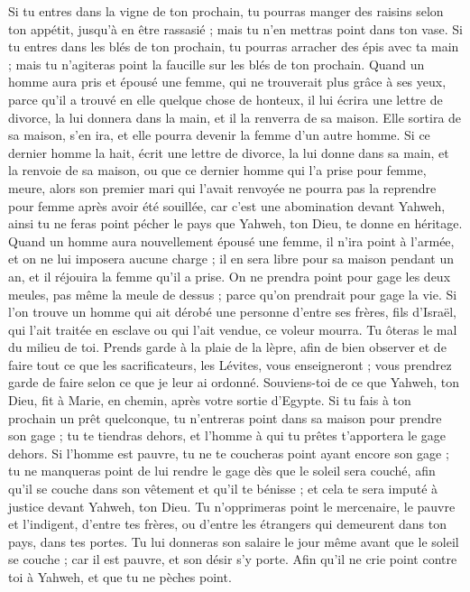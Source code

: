 \begin{multicols}{2}
Si tu entres dans la vigne de ton prochain, tu pourras manger des raisins selon ton appétit, jusqu'à en être rassasié ; mais tu n'en mettras point dans ton vase.
Si tu entres dans les blés de ton prochain, tu pourras arracher des épis avec ta main ; mais tu n’agiteras point la faucille sur les blés de ton prochain.
\VerseOne{}Quand un homme aura pris et épousé une femme, qui ne trouverait plus grâce à ses yeux, parce qu’il a trouvé en elle quelque chose de honteux, il lui écrira une lettre de divorce, la lui donnera dans la main, et il la renverra de sa maison.
Elle sortira de sa maison, s’en ira, et elle pourra devenir la femme d’un autre homme.
Si ce dernier homme la hait, écrit une lettre de divorce, la lui donne dans sa main, et la renvoie de sa maison, ou que ce dernier homme qui l'a prise pour femme, meure,
alors son premier mari qui l'avait renvoyée ne pourra pas la reprendre pour femme après avoir été souillée, car c'est une abomination devant Yahweh, ainsi tu ne feras point pécher le pays que Yahweh, ton Dieu, te donne en héritage.
Quand un homme aura nouvellement épousé une femme, il n'ira point à l’armée, et on ne lui imposera aucune charge ; il en sera libre pour sa maison pendant un an, et il réjouira la femme qu'il a prise.
On ne prendra point pour gage les deux meules, pas même la meule de dessus ; parce qu'on prendrait pour gage la vie.
Si l’on trouve un homme qui ait dérobé une personne d’entre ses frères, fils d'Israël, qui l’ait traitée en esclave ou qui l’ait vendue, ce voleur mourra. Tu ôteras le mal du milieu de toi.
Prends garde à la plaie de la lèpre, afin de bien observer et de faire tout ce que les sacrificateurs, les Lévites, vous enseigneront ; vous prendrez garde de faire selon ce que je leur ai ordonné.
Souviens-toi de ce que Yahweh, ton Dieu, fit à Marie, en chemin, après votre sortie d'Egypte.
Si tu fais à ton prochain un prêt quelconque, tu n'entreras point dans sa maison pour prendre son gage ;
tu te tiendras dehors, et l'homme à qui tu prêtes t'apportera le gage dehors.
Si l'homme est pauvre, tu ne te coucheras point ayant encore son gage ;
tu ne manqueras point de lui rendre le gage dès que le soleil sera couché, afin qu'il se couche dans son vêtement et qu'il te bénisse ; et cela te sera imputé à justice devant Yahweh, ton Dieu.
Tu n’opprimeras point le mercenaire, le pauvre et l’indigent, d'entre tes frères, ou d'entre les étrangers qui demeurent dans ton pays, dans tes portes.
Tu lui donneras son salaire le jour même avant que le soleil se couche ; car il est pauvre, et son désir s’y porte. Afin qu'il ne crie point contre toi à Yahweh, et que tu ne pèches point.

\end{multicols}
